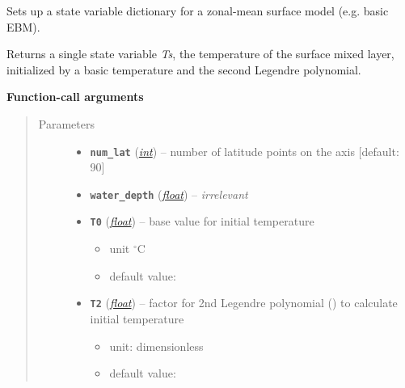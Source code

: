 \documentclass[a4paper,10pt,english]{sphinxmanual}
\begin{document}
\begin{fulllineitems}
\label{api/climlab.domain:climlab.domain.initial.surface_state}
Sets up a state variable dictionary for a zonal-mean surface model
(e.g. basic EBM).

Returns a single state variable \emph{Ts}, the temperature of the surface 
mixed layer, initialized by a basic temperature and the second Legendre
polynomial.

\textbf{Function-call arguments}
\begin{quote}\begin{description}
\item[{Parameters}] \leavevmode\begin{itemize}
\item {} 
\textbf{\texttt{num\_lat}} (\href{http://docs.python.org/2.7/library/functions.html\#int}{\emph{int}}) -- number of latitude points on the axis
{[}default: 90{]}

\item {} 
\textbf{\texttt{water\_depth}} (\href{http://docs.python.org/2.7/library/functions.html\#float}{\emph{float}}) -- \emph{irrelevant}

\item {} 
\textbf{\texttt{T0}} (\href{http://docs.python.org/2.7/library/functions.html\#float}{\emph{float}}) -- 
base value for initial temperature
\begin{itemize}
\item {} 
unit \(^{\circ} \textrm{C}\)

\item {} 
default value: 

\end{itemize}


\item {} 
\textbf{\texttt{T2}} (\href{http://docs.python.org/2.7/library/functions.html\#float}{\emph{float}}) -- 
factor for 2nd Legendre polynomial 
{\hyperref[api/climlab.utils:climlab.utils.legendre.P2]{\emph{}}} () 
to calculate initial temperature
\begin{itemize}
\item {} 
unit: dimensionless

\item {} 
default value: 

\end{itemize}



\end{itemize}
\end{description}
\end{quote}
\end{fulllineitems}
\end{document}
